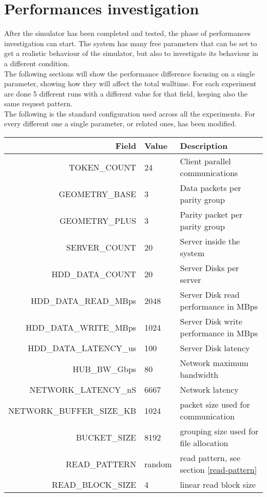 \chapter{Performances investigation}\label{sys-analysis}
After the simulator has been completed and tested, the phase of performances
investigation can start. The system has many free parameters that can be set to
get a realistic behaviour of the simulator, but also to investigate its
behaviour in a different condition. \\
The following sections will show the performance difference focusing on a single
parameter, showing how they will affect the total walltime. For each experiment
are done 5 different runs with a different value for that field, keeping also the
same request pattern. \\
The following is the standard configuration used across all the experiments. For
every different one a single parameter, or related ones, has been modified. \\
\small
\begin{tabular}{r | l | p{}}
    \textbf{Field} & \textbf{Value} & \textbf{Description}\\ \hline
    TOKEN\_COUNT & 24 & Client parallel communications\\
    GEOMETRY\_BASE & 3 & Data packets per parity group \\
    GEOMETRY\_PLUS & 3 & Parity packet per parity group\\
    SERVER\_COUNT & 20 & Server inside the system \\
    HDD\_DATA\_COUNT & 20 & Server Disks per server \\
    HDD\_DATA\_READ\_MBps & 2048 & Server Disk read performance in MBps\\
    HDD\_DATA\_WRITE\_MBps & 1024 & Server Disk write performance in MBps\\
    HDD\_DATA\_LATENCY\_us & 100 & Server Disk latency\\
    HUB\_BW\_Gbps & 80 & Network maximum bandwidth\\
    NETWORK\_LATENCY\_nS & 6667 & Network latency\\
    NETWORK\_BUFFER\_SIZE\_KB & 1024 & packet size used for communication\\
    BUCKET\_SIZE & 8192 & grouping size used for file allocation\\
    READ\_PATTERN & random & read pattern, see section \ref{read-pattern} \\
    READ\_BLOCK\_SIZE & 4 & linear read block size \\
\end{tabular}
\normalsize



